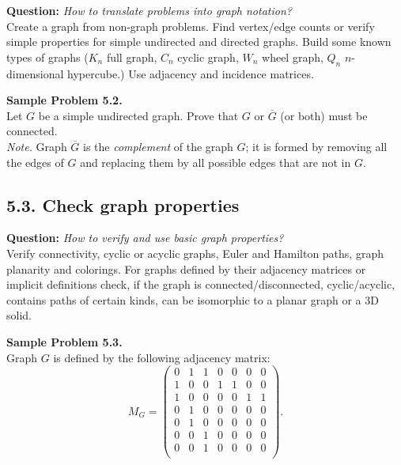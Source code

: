 \documentclass[jou]{apa6}
\begin{document}
{\bf Question:} {\em How to translate problems into graph notation?}\\
{\scriptsize 
Create a graph from non-graph problems. Find vertex/edge counts or verify 
simple properties for simple undirected and directed graphs. Build some known types of graphs 
($K_n$ \textendash{} full graph, $C_n$ \textendash{} cyclic graph, 
$W_n$ \textendash{} wheel graph, $Q_n$ \textendash{} $n$-dimensional hypercube.) 
Use adjacency and incidence matrices.
}






\vspace{6pt}
{\bf Sample Problem 5.2.}\\
Let $G$ be a simple undirected graph. Prove that $G$ or $\overline{G}$ (or both) must be connected.\\
{\em Note.} Graph $\overline{G}$ is the {\em complement} of the graph $G$; it is formed by removing all the edges of 
$G$ and replacing them by all possible edges that are not in $G$. 

\subsection{5.3. Check graph properties} 

{\bf Question:} {\em How to verify and use basic graph properties?}\\
{\scriptsize 
Verify connectivity, cyclic or acyclic graphs, Euler and Hamilton paths, 
graph planarity and colorings. For graphs defined by their adjacency matrices 
or implicit definitions check, if the graph is connected/disconnected, 
cyclic/acyclic, contains paths of certain kinds, 
can be isomorphic to a planar graph or a 3D solid. 
}


\vspace{6pt}
{\bf Sample Problem 5.3.}\\
Graph $G$ is defined by the following adjacency matrix:
$$M_G = \left(
\begin{array}{ccccccc}
0 & 1 & 1 & 0 & 0 & 0 & 0 \\
1 & 0 & 0 & 1 & 1 & 0 & 0 \\
1 & 0 & 0 & 0 & 0 & 1 & 1 \\
0 & 1 & 0 & 0 & 0 & 0 & 0 \\
0 & 1 & 0 & 0 & 0 & 0 & 0 \\
0 & 0 & 1 & 0 & 0 & 0 & 0 \\
0 & 0 & 1 & 0 & 0 & 0 & 0 \\
\end{array} \right).$$
\end{document}
